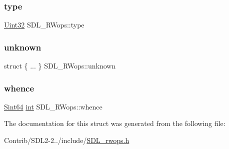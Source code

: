 \subsubsection{\texorpdfstring{type}{type}}
{\footnotesize\ttfamily \mbox{\hyperlink{_s_d_l__stdinc_8h_add440eff171ea5f55cb00c4a9ab8672d}{Uint32}} S\+D\+L\+\_\+\+R\+Wops\+::type}

\mbox{\label{struct_s_d_l___r_wops_a6b636d6299921142a119931d76a588b7}} 
\subsubsection{\texorpdfstring{unknown}{unknown}}
{\footnotesize\ttfamily struct \{ ... \}   S\+D\+L\+\_\+\+R\+Wops\+::unknown}

\mbox{\label{struct_s_d_l___r_wops_a95b96dcc6690897bfaf2d059f4378ed2}} 
\subsubsection{\texorpdfstring{whence}{whence}}
{\footnotesize\ttfamily \mbox{\hyperlink{_s_d_l__stdinc_8h_a2c1a61d5c466bb74680be0a8cc1b455d}{Sint64}} \mbox{\hyperlink{struct_s_d_l___r_wops_ab303bcbb0f6742a141ba8b2998923f47}{int}} S\+D\+L\+\_\+\+R\+Wops\+::whence}



The documentation for this struct was generated from the following file\+:\begin{DoxyCompactItemize}
\item 
Contrib/\+S\+D\+L2-\/2../include/\mbox{\hyperlink{_s_d_l__rwops_8h}{S\+D\+L\+\_\+rwops.\+h}}\end{DoxyCompactItemize}
